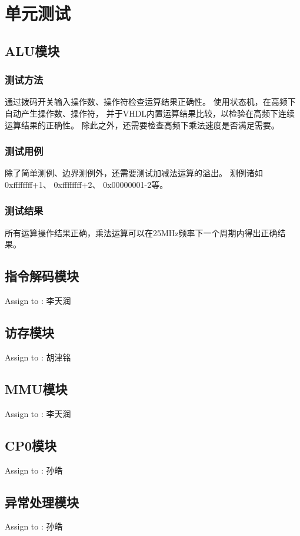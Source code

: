 \section{单元测试}


    \subsection{ALU模块}


        \subsubsection{测试方法}
            通过拨码开关输入操作数、操作符检查运算结果正确性。%
            使用状态机，在高频下自动产生操作数、操作符，%
            并于VHDL内置运算结果比较，以检验在高频下连续运算结果的正确性。%
            除此之外，还需要检查高频下乘法速度是否满足需要。

        \subsubsection{测试用例}
            除了简单测例、边界测例外，还需要测试加减法运算的溢出。
            测例诸如%
            0xffffffff+1、%
            0xffffffff+2、%
            0x00000001-2等。

        \subsubsection{测试结果}
            所有运算操作结果正确，乘法运算可以在25MHz频率下一个周期内得出正确结果。

    \subsection{指令解码模块}
        Assign to : 李天润

    \subsection{访存模块}
        Assign to : 胡津铭

    \subsection{MMU模块}
        Assign to  : 李天润

    \subsection{CP0模块}
        Assign to  : 孙皓

    \subsection{异常处理模块}
        Assign to  : 孙皓
